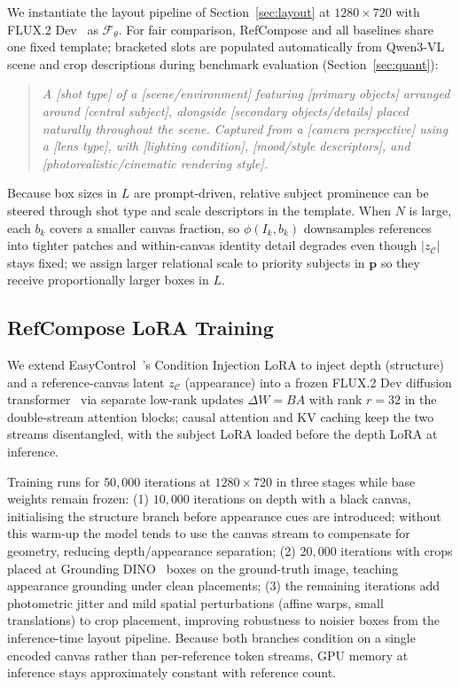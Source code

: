 \documentclass[runningheads]{llncs}
\begin{document}
We instantiate the layout pipeline of Section~\ref{sec:layout} at $1280 \times 720$ with FLUX.2 Dev~\cite{blackforestlabs2026flux2dev} as $\mathcal{F}_\theta$.
For fair comparison, RefCompose and all baselines share one fixed template; bracketed slots are populated automatically from Qwen3-VL~\cite{qwen3vl} scene and crop descriptions during benchmark evaluation (Section~\ref{sec:quant}):
\begin{quote}
\small
\textit{A [shot type] of a [scene/environment] featuring [primary objects] arranged around [central subject], alongside [secondary objects/details] placed naturally throughout the scene. Captured from a [camera perspective] using a [lens type], with [lighting condition], [mood/style descriptors], and [photorealistic/cinematic rendering style].}
\end{quote}

Because box sizes in $L$ are prompt-driven, relative subject prominence can be steered through shot type and scale descriptors in the template.
When $N$ is large, each $b_k$ covers a smaller canvas fraction, so $\phi(I_k, b_k)$ downsamples references into tighter patches and within-canvas identity detail degrades even though $|z_{\mathcal{C}}|$ stays fixed; we assign larger relational scale to priority subjects in $\mathbf{p}$ so they receive proportionally larger boxes in $L$.

\subsection{RefCompose LoRA Training}
We extend EasyControl~\cite{zhang2025easycontrol}'s Condition Injection LoRA to inject depth (structure) and a reference-canvas latent $z_{\mathcal{C}}$ (appearance) into a frozen FLUX.2 Dev diffusion transformer~\cite{blackforestlabs2026flux2dev} via separate low-rank updates $\Delta W = BA$ with rank $r{=}32$ in the double-stream attention blocks; causal attention and KV caching keep the two streams disentangled, with the subject LoRA loaded before the depth LoRA at inference.

Training runs for $50{,}000$ iterations at $1280 \times 720$ in three stages while base weights remain frozen: (1) $10{,}000$ iterations on depth with a black canvas, initialising the structure branch before appearance cues are introduced; without this warm-up the model tends to use the canvas stream to compensate for geometry, reducing depth/appearance separation; (2) $20{,}000$ iterations with crops placed at Grounding DINO~\cite{liu2023grounding} boxes on the ground-truth image, teaching appearance grounding under clean placements; (3) the remaining iterations add photometric jitter and mild spatial perturbations (affine warps, small translations) to crop placement, improving robustness to noisier boxes from the inference-time layout pipeline. Because both branches condition on a single encoded canvas rather than per-reference token streams, GPU memory at inference stays approximately constant with reference count.
\end{document}
